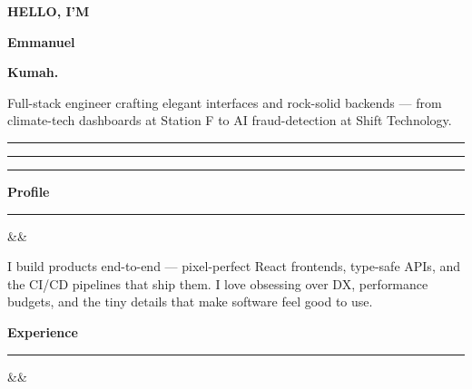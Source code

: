 \documentclass[10pt,a4paper]{article}
\newcommand{\sectiontitle}[2]{%
  {\displayfont\bfseries\fontsize{14}{16}\selectfont\color{ink} #1}\hspace{0.4em}%
  {\color{accent}\rule[0.25ex]{1.6cm}{1.2pt}}\par
  \ifx&#2&\else\vspace{-2pt}\textcolor{inkMute}{\small #2}\par\fi
  \vspace{6pt}
}
\begin{document}
\begin{minipage}[t]{\dimexpr\textwidth-6.2cm-1.2cm\relax}
  \vspace{1.2cm}\hspace{0.4cm}\begin{minipage}{\linewidth-0.4cm}

  \noindent
  {\monofont\small\color{accent}\textbf{HELLO, I'M}}\par
  \vspace{2pt}
  {\displayfont\bfseries\fontsize{34}{38}\selectfont\color{ink}Emmanuel}\par
  {\displayfont\bfseries\fontsize{34}{38}\selectfont\color{accent}Kumah.}\par
  \vspace{6pt}
  {\color{inkSoft}\fontsize{11}{14}\selectfont
    Full-stack engineer crafting elegant interfaces and
    rock-solid backends — from climate-tech dashboards
    at Station F to AI fraud-detection at Shift Technology.}
  \par
  \vspace{14pt}
  {\color{accent}\rule{2.2cm}{1.4pt}}\hspace{4pt}%
  {\color{electric}\rule{1.4cm}{1.4pt}}\hspace{4pt}%
  {\color{cyanGlow}\rule{0.7cm}{1.4pt}}
  \vspace{14pt}

  \sectiontitle{Profile}{}
  {\color{inkSoft}\small\justifying
  I build products end-to-end — pixel-perfect React frontends,
  type-safe APIs, and the CI/CD pipelines that ship them. I love
  obsessing over DX, performance budgets, and the tiny details that
  make software feel good to use.}
  \vspace{10pt}

  \sectiontitle{Experience}{}


\end{minipage}
\end{minipage}
\end{document}
